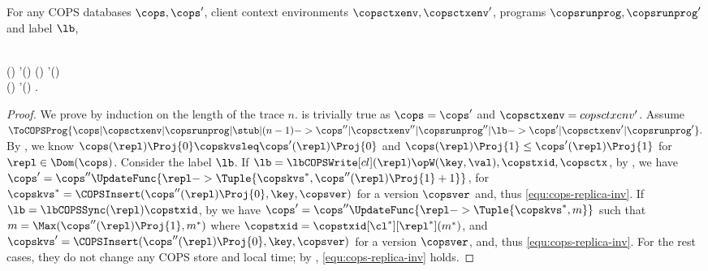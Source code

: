 \begin{proposition}
\label{prop:cops-inv}
For any COPS databases \( \cops, \cops'\), client context environments \( \copsctxenv, \copsctxenv' \),
programs \( \copsrunprog, \copsrunprog' \) and label \( \lb \),
\begin{Formulae}
\begin{Formula}
    \\ \implies \Forall{\repl \in \Dom(\cops)} \cops(\repl) \copskvsleq \cops'(\repl)
    \land \cops(\repl) \leq \cops'(\repl) 
    \\ {} \land \Forall{\cl \in \Dom(\copsctxenv)} \copsctxenv(\cl) \subseteq  \copsctxenv'(\cl) .
\label{equ:cops-replica-inv}
\end{Formula}
\end{Formulae}
\end{proposition}
\begin{proof}
We prove by induction on the length of the trace \( n \).
     is trivially true as \( \cops = \cops' \) and \( \copsctxenv = copsctxenv' \).
    Assume
    \(
        \ToCOPSProg{ \cops | \copsctxenv | \copsrunprog | \stub | (n-1)
        -> \cops'' | \copsctxenv'' | \copsrunprog'' | \lb
        -> \cops' | \copsctxenv' | \copsrunprog' }.
    \)
    By \ih, we know \( \cops(\repl)\Proj{0} \copskvsleq \cops'(\repl)\Proj{0} \) 
    and \( \cops(\repl)\Proj{1} \leq \cops'(\repl)\Proj{1} \)  for \( \repl \in \Dom(\cops) \).
    Consider the label \( \lb \).
    If \( \lb = \lbCOPSWrite[cl](\repl){\opW(\key,\val), \copstxid, \copsctx } \),
    by \rCOPSWrite, we have \( \cops' = \cops''\UpdateFunc{{\repl} -> \Tuple{\copskvs^*, \cops''(\repl)\Proj{1} + 1}}\),
    for \( \copskvs^* = \COPSInsert(\cops''(\repl)\Proj{0},\key,\copsver) \) for a version \( \copsver \)
    and, thus \cref{equ:cops-replica-inv}.
    If \( \lb = \lbCOPSSync(\repl){\copstxid} \),
    by \rCOPSSync we have \( \cops' = \cops''\UpdateFunc{\repl -> \Tuple{\copskvs^*, m } }\) such that
    \( m =\Max(\cops''(\repl)\Proj{1},m^*) \) where \( \copstxid = \copstxid[\cl^*][\repl^*](m^*)\), 
    and \( \copskvs' = \COPSInsert(\cops''(\repl)\Proj{0},\key,\copsver) \) for a version \( \copsver \),
    and, thus \cref{equ:cops-replica-inv}.
    For the rest cases, they do not change any COPS store and local time;
    by \ih, \cref{equ:cops-replica-inv} holds. 
\end{proof}

